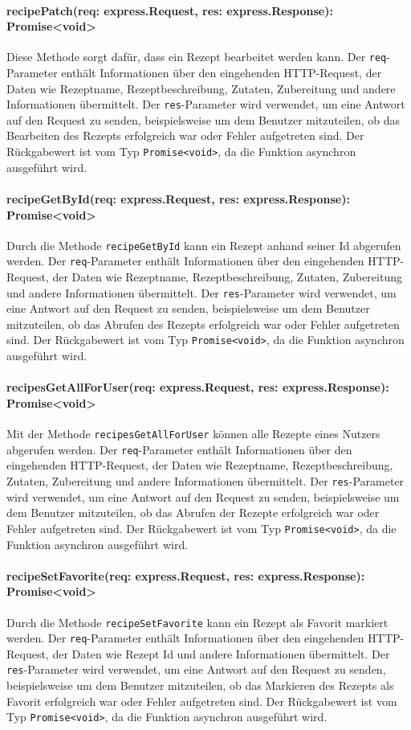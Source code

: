 \documentclass{entwurfsheft}
\begin{document}
\paragraph{recipePatch(req: express.Request, res: express.Response): Promise<void>}
Diese Methode sorgt dafür, dass ein Rezept bearbeitet werden kann. Der \texttt{req}-Parameter enthält Informationen über den eingehenden HTTP-Request, der Daten wie Rezeptname, Rezeptbeschreibung, Zutaten, Zubereitung und andere Informationen übermittelt. Der \texttt{res}-Parameter wird verwendet, um eine Antwort auf den Request zu senden, beispielsweise um dem Benutzer mitzuteilen, ob das Bearbeiten des Rezepts erfolgreich war oder Fehler aufgetreten sind.
Der Rückgabewert ist vom Typ \texttt{Promise<void>}, da die Funktion asynchron ausgeführt wird.
\paragraph{recipeGetById(req: express.Request, res: express.Response): Promise<void>}
Durch die Methode \texttt{recipeGetById} kann ein Rezept anhand seiner Id abgerufen werden. Der \texttt{req}-Parameter enthält Informationen über den eingehenden HTTP-Request, der Daten wie Rezeptname, Rezeptbeschreibung, Zutaten, Zubereitung und andere Informationen übermittelt. Der \texttt{res}-Parameter wird verwendet, um eine Antwort auf den Request zu senden, beispielsweise um dem Benutzer mitzuteilen, ob das Abrufen des Rezepts erfolgreich war oder Fehler aufgetreten sind.
Der Rückgabewert ist vom Typ \texttt{Promise<void>}, da die Funktion asynchron ausgeführt wird.
\paragraph{recipesGetAllForUser(req: express.Request, res: express.Response): Promise<void>}
Mit der Methode \texttt{recipesGetAllForUser} können alle Rezepte eines Nutzers abgerufen werden. Der \texttt{req}-Parameter enthält Informationen über den eingehenden HTTP-Request, der Daten wie Rezeptname, Rezeptbeschreibung, Zutaten, Zubereitung und andere Informationen übermittelt. Der \texttt{res}-Parameter wird verwendet, um eine Antwort auf den Request zu senden, beispielsweise um dem Benutzer mitzuteilen, ob das Abrufen der Rezepte erfolgreich war oder Fehler aufgetreten sind.
Der Rückgabewert ist vom Typ \texttt{Promise<void>}, da die Funktion asynchron ausgeführt wird.
\paragraph{recipeSetFavorite(req: express.Request, res: express.Response): Promise<void>}
Durch die Methode \texttt{recipeSetFavorite} kann ein Rezept als Favorit markiert werden. Der \texttt{req}-Parameter enthält Informationen über den eingehenden HTTP-Request, der Daten wie Rezept Id und andere Informationen übermittelt. Der \texttt{res}-Parameter wird verwendet, um eine Antwort auf den Request zu senden, beispielsweise um dem Benutzer mitzuteilen, ob das Markieren des Rezepts als Favorit erfolgreich war oder Fehler aufgetreten sind.
Der Rückgabewert ist vom Typ \texttt{Promise<void>}, da die Funktion asynchron ausgeführt wird.
\end{document}
